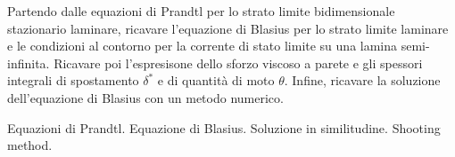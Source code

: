 \noindent
\begin{exerciseS}
Partendo dalle equazioni di Prandtl per lo strato limite bidimensionale stazionario laminare, ricavare l'equazione di Blasius per lo strato limite laminare e le condizioni al contorno per la corrente di stato limite su una lamina semi-infinita. \newline
Ricavare poi l'espresisone dello sforzo viscoso a parete e gli spessori integrali di spostamento $\delta^*$ e di quantità di moto $\theta$. \newline
Infine, ricavare la soluzione dell'equazione di Blasius con un metodo numerico.
\end{exerciseS}

\sol

\partone Equazioni di Prandtl. Equazione di Blasius. Soluzione in similitudine. 
Shooting method.

\parttwo 

